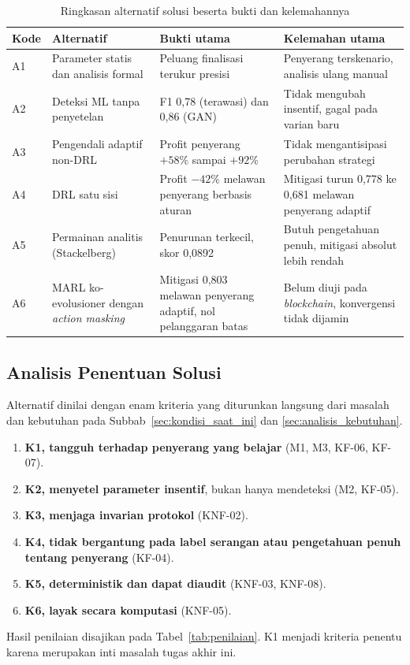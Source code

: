 \begin{table}[htbp]
\centering
\caption{Ringkasan alternatif solusi beserta bukti dan kelemahannya}
\label{tab:alternatif}
\small
\begin{tabular}{|p{0.9cm}|p{3.0cm}|p{4.3cm}|p{4.0cm}|}
\hline
\textbf{Kode} & \textbf{Alternatif} & \textbf{Bukti utama} & \textbf{Kelemahan utama} \\
\hline
A1 & Parameter statis dan analisis formal & Peluang finalisasi terukur presisi \parencite{laneve2025stochastic} & Penyerang terskenario, analisis ulang manual \\
\hline
A2 & Deteksi ML tanpa penyetelan & F1 0,78 (terawasi) dan 0,86 (GAN) \parencite{skowronski2026adaptive} & Tidak mengubah insentif, gagal pada varian baru \\
\hline
A3 & Pengendali adaptif non-DRL & Profit penyerang $+58\%$ sampai $+92\%$ \parencite{skowronski2026adaptive} & Tidak mengantisipasi perubahan strategi \\
\hline
A4 & DRL satu sisi & Profit $-42\%$ melawan penyerang berbasis aturan \parencite{skowronski2026adaptive} & Mitigasi turun 0,778 ke 0,681 melawan penyerang adaptif \parencite{wushishi2026coadam} \\
\hline
A5 & Permainan analitis (Stackelberg) & Penurunan terkecil, skor 0,0892 \parencite{wushishi2026coadam} & Butuh pengetahuan penuh, mitigasi absolut lebih rendah \\
\hline
A6 & MARL ko-evolusioner dengan \textit{action masking} & Mitigasi 0,803 melawan penyerang adaptif, nol pelanggaran batas \parencite{wushishi2026coadam, skowronski2026adaptive} & Belum diuji pada \textit{blockchain}, konvergensi tidak dijamin \\
\hline
\end{tabular}
\end{table}

\subsection{Analisis Penentuan Solusi}
\label{subsec:penentuan_solusi}
Alternatif dinilai dengan enam kriteria yang diturunkan langsung dari masalah dan kebutuhan pada Subbab~\ref{sec:kondisi_saat_ini} dan \ref{sec:analisis_kebutuhan}.
\begin{enumerate}
	\item \textbf{K1, tangguh terhadap penyerang yang belajar} (M1, M3, KF-06, KF-07).
	\item \textbf{K2, menyetel parameter insentif}, bukan hanya mendeteksi (M2, KF-05).
	\item \textbf{K3, menjaga invarian protokol} (KNF-02).
	\item \textbf{K4, tidak bergantung pada label serangan atau pengetahuan penuh tentang penyerang} (KF-04).
	\item \textbf{K5, deterministik dan dapat diaudit} (KNF-03, KNF-08).
	\item \textbf{K6, layak secara komputasi} (KNF-05).
\end{enumerate}
Hasil penilaian disajikan pada Tabel~\ref{tab:penilaian}. K1 menjadi kriteria penentu karena merupakan inti masalah tugas akhir ini.

